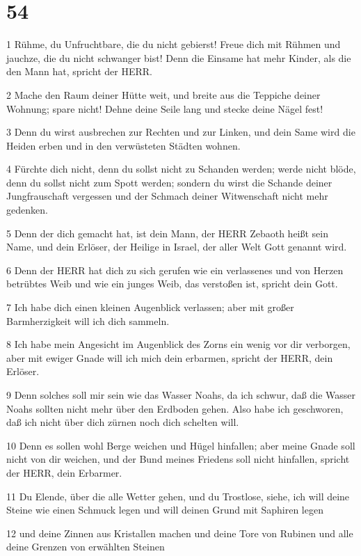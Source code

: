 \chapter{54}

\par 1 Rühme, du Unfruchtbare, die du nicht gebierst! Freue dich mit Rühmen und jauchze, die du nicht schwanger bist! Denn die Einsame hat mehr Kinder, als die den Mann hat, spricht der HERR.
\par 2 Mache den Raum deiner Hütte weit, und breite aus die Teppiche deiner Wohnung; spare nicht! Dehne deine Seile lang und stecke deine Nägel fest!
\par 3 Denn du wirst ausbrechen zur Rechten und zur Linken, und dein Same wird die Heiden erben und in den verwüsteten Städten wohnen.
\par 4 Fürchte dich nicht, denn du sollst nicht zu Schanden werden; werde nicht blöde, denn du sollst nicht zum Spott werden; sondern du wirst die Schande deiner Jungfrauschaft vergessen und der Schmach deiner Witwenschaft nicht mehr gedenken.
\par 5 Denn der dich gemacht hat, ist dein Mann, der HERR Zebaoth heißt sein Name, und dein Erlöser, der Heilige in Israel, der aller Welt Gott genannt wird.
\par 6 Denn der HERR hat dich zu sich gerufen wie ein verlassenes und von Herzen betrübtes Weib und wie ein junges Weib, das verstoßen ist, spricht dein Gott.
\par 7 Ich habe dich einen kleinen Augenblick verlassen; aber mit großer Barmherzigkeit will ich dich sammeln.
\par 8 Ich habe mein Angesicht im Augenblick des Zorns ein wenig vor dir verborgen, aber mit ewiger Gnade will ich mich dein erbarmen, spricht der HERR, dein Erlöser.
\par 9 Denn solches soll mir sein wie das Wasser Noahs, da ich schwur, daß die Wasser Noahs sollten nicht mehr über den Erdboden gehen. Also habe ich geschworen, daß ich nicht über dich zürnen noch dich schelten will.
\par 10 Denn es sollen wohl Berge weichen und Hügel hinfallen; aber meine Gnade soll nicht von dir weichen, und der Bund meines Friedens soll nicht hinfallen, spricht der HERR, dein Erbarmer.
\par 11 Du Elende, über die alle Wetter gehen, und du Trostlose, siehe, ich will deine Steine wie einen Schmuck legen und will deinen Grund mit Saphiren legen
\par 12 und deine Zinnen aus Kristallen machen und deine Tore von Rubinen und alle deine Grenzen von erwählten Steinen
